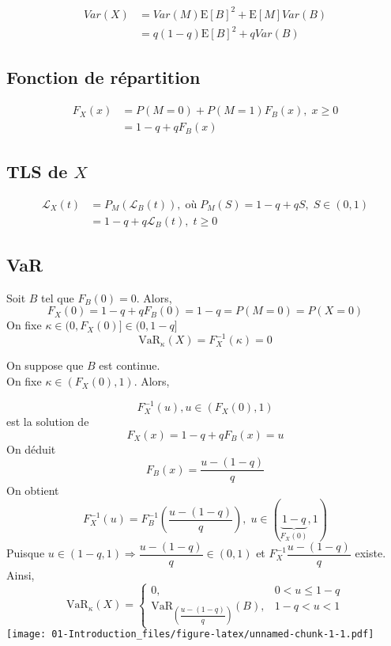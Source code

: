 \documentclass[]{book}
\theoremstyle{definition}
\theoremstyle{definition}
\theoremstyle{definition}
\theoremstyle{remark}
\begin{document}
\begin{align*}
Var(X)& = Var(M)\text{E}[B]^2+\text{E}[M]Var(B)\\
& =q(1-q)\text{E}[B]^2+qVar(B)
\end{align*}

\subsection{Fonction de répartition}\label{fonction-de-repartition-1}

\begin{align*}
F_X(x)& =P(M=0)+P(M=1)F_B(x),\;x\geq 0\\
& =1-q+q F_B(x)
\end{align*}

\subsection{\texorpdfstring{TLS de \(X\)}{TLS de X}}\label{tls-de-x-1}

\begin{align*}
\mathcal{L}_X(t)& = P_M(\mathcal{L}_B(t)),\; \text{où}\; P_M(S)=1-q+qS,\; S\in (0,1)\\
& =1-q+q\mathcal{L}_B(t),\;t \geq 0
\end{align*}

\subsection{VaR}\label{var}

Soit \(B\) tel que \(F_B(0)=0\). Alors, \[
F_X(0)=1-q+ qF_B(0)=1-q=P(M=0)=P(X=0)
\] On fixe \(\kappa \in (0,F_X(0)] \in (0,1-q]\) \[
\text{VaR}_\kappa (X) =F_X^{-1}(\kappa)=0
\]

On suppose que \(B\) est continue.\\
On fixe \(\kappa \in (F_X(0),1)\). Alors,

\[
F_X^{-1}(u), u \in (F_X(0),1)
\] est la solution de \[
F_X(x) =1-q+qF_B(x)=u
\] On déduit \[
F_B(x) =\dfrac{u-(1-q)}{q}
\] On obtient \[
F_X^{-1}(u) =F_B^{-1} \left( \dfrac{u-(1-q)}{q} \right),\;u\in(\underbrace{1-q}_{F_X(0)},1)
\] Puisque \(u\in(1-q,1)\Rightarrow \dfrac{u-(1-q)}{q}\in(0,1)\) et
\(F_X^{-1}{\dfrac{u-(1-q)}{q}}\) existe.\\
Ainsi, \[
\text{VaR}_\kappa (X) = 
\begin{cases}
0,& 0<u\leq 1-q\\
\text{VaR}_{\left({\dfrac{u-(1-q)}{q}}\right)} (B),& 1-q<u<1
\end{cases}
\]
\texttt{[image: 01-Introduction\_files/figure-latex/unnamed-chunk-1-1.pdf]}
\end{document}
